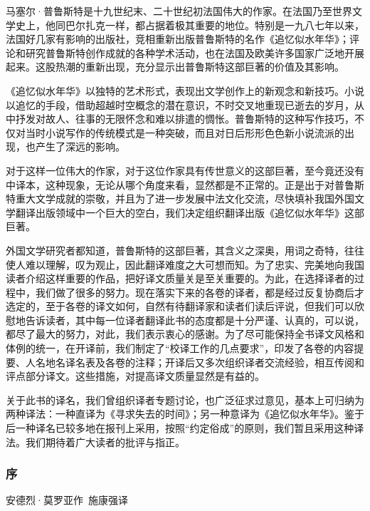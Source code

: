 \par 马塞尔·普鲁斯特是十九世纪末、二十世纪初法国伟大的作家。在法国乃至世界文学史上，他同巴尔扎克一样，都占据着极其重要的地位。特别是一九八七年以来，法国好几家有影响的出版社，竞相重新出版普鲁斯特的名作《追忆似水年华》；评论和研究普鲁斯特创作成就的各种学术活动，也在法国及欧美许多国家广泛地开展起来。这股热潮的重新出现，充分显示出普鲁斯特这部巨著的价值及其影响。
\par 《追忆似水年华》以独特的艺术形式，表现出文学创作上的新观念和新技巧。小说以追忆的手段，借助超越时空概念的潜在意识，不时交叉地重现已逝去的岁月，从中抒发对故人、往事的无限怀念和难以排遣的惆怅。普鲁斯特的这种写作技巧，不仅对当时小说写作的传统模式是一种突破，而且对日后形形色色新小说流派的出现，也产生了深远的影响。
\par 对于这样一位伟大的作家，对于这位作家具有传世意义的这部巨著，至今竟还没有中译本，这种现象，无论从哪个角度来看，显然都是不正常的。正是出于对普鲁斯特重大文学成就的崇敬，并且为了进一步发展中法文化交流，尽快填补我国外国文学翻译出版领域中一个巨大的空白，我们决定组织翻译出版《追忆似水年华》这部巨著。
\par 外国文学研究者都知道，普鲁斯特的这部巨著，其含义之深奥，用词之奇特，往往使人难以理解，叹为观止，因此翻译难度之大可想而知。为了忠实、完美地向我国读者介绍这样重要的作品，把好译文质量关是至关重要的。为此，在选择译者的过程中，我们做了很多的努力。现在落实下来的各卷的译者，都是经过反复协商后才选定的，至于各卷的译文如何，自然有待翻译家和读者们读后评说，但我们可以欣慰地告诉读者，其中每一位译者翻译此书的态度都是十分严谨、认真的，可以说，都尽了最大的努力，对此，我们表示衷心的感谢。为了尽可能保持全书译文风格和体例的统一，在开译前，我们制定了“校译工作的几点要求”，印发了各卷的内容提要、人名地名译名表及各卷的注释；开译后又多次组织译者交流经验，相互传阅和评点部分译文。这些措施，对提高译文质量显然是有益的。
\par 关于此书的译名，我们曾组织译者专题讨论，也广泛征求过意见，基本上可归纳为两种译法：一种直译为《寻求失去的时间》；另一种意译为《追忆似水年华》。鉴于后一种译名已较多地在报刊上采用，按照“约定俗成”的原则，我们暂且采用这种译法。我们期待着广大读者的批评与指正。
\par {}
\par {}


\subsubsection*{序}

\begin{center}
    安德烈·莫罗亚作\ 施康强译
\end{center}

